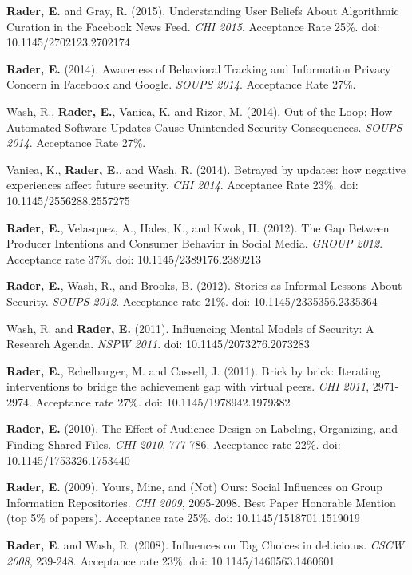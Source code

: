 \documentclass[9pt]{extarticle}
\begin{document}
\textbf{Rader, E.} and Gray, R. (2015). Understanding User Beliefs About Algorithmic Curation in the Facebook News Feed. \emph{CHI 2015}. Acceptance Rate 25\%. doi: 10.1145/2702123.2702174

\textbf{Rader, E.} (2014). Awareness of Behavioral Tracking and Information Privacy Concern in Facebook and Google. \emph{SOUPS 2014}. Acceptance Rate 27\%.

Wash, R., \textbf{Rader, E.}, Vaniea, K. and Rizor, M. (2014). Out of the Loop: How Automated Software Updates Cause Unintended Security Consequences. \emph{SOUPS 2014}. Acceptance Rate 27\%.

Vaniea, K., \textbf{Rader, E.}, and Wash, R. (2014). Betrayed by updates: how negative experiences affect future security. \emph{CHI 2014}. Acceptance Rate 23\%. doi: 10.1145/2556288.2557275

\textbf{Rader, E.}, Velasquez, A., Hales, K., and Kwok, H. (2012). The Gap Between Producer Intentions and Consumer Behavior in Social Media. \emph{GROUP 2012}. Acceptance rate 37\%. doi: 10.1145/2389176.2389213

\textbf{Rader, E.}, Wash, R., and Brooks, B. (2012). Stories as Informal Lessons About Security. \emph{SOUPS 2012}. Acceptance rate 21\%. doi: 10.1145/2335356.2335364

Wash, R. and \textbf{Rader, E.} (2011). Influencing Mental Models of Security: A Research Agenda. \emph{NSPW 2011}. doi: 10.1145/2073276.2073283

\textbf{Rader, E.}, Echelbarger, M. and Cassell, J. (2011). Brick by brick: Iterating interventions to bridge the achievement gap with virtual peers. \emph{CHI 2011}, 2971-2974. Acceptance rate 27\%. doi: 10.1145/1978942.1979382

\textbf{Rader, E.} (2010). The Effect of Audience Design on Labeling, Organizing, and Finding Shared Files. \emph{CHI 2010}, 777-786. Acceptance rate 22\%. doi: 10.1145/1753326.1753440

\textbf{Rader, E.} (2009). Yours, Mine, and (Not) Ours: Social Influences on Group Information Repositories. \emph{CHI 2009}, 2095-2098. Best Paper Honorable Mention (top 5\% of papers). Acceptance rate 25\%. doi: 10.1145/1518701.1519019

\textbf{Rader, E}. and Wash, R. (2008). Influences on Tag Choices in del.icio.us. \emph{CSCW 2008}, 239-248. Acceptance rate 23\%. doi: 10.1145/1460563.1460601
\end{document}
